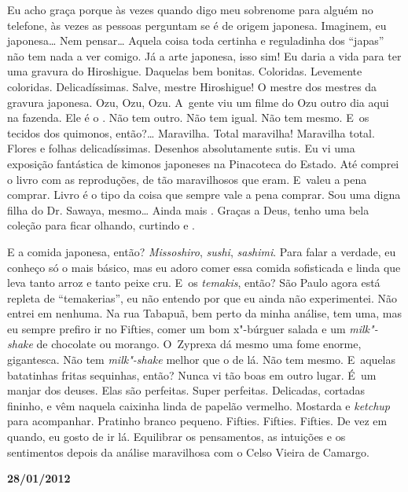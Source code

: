 Eu acho graça porque às vezes quando digo meu sobrenome para alguém no
telefone, às vezes as pessoas perguntam se é de origem japonesa.
Imaginem, eu japonesa… Nem pensar… Aquela coisa toda
certinha e reguladinha dos ``japas'' não tem nada a ver comigo. Já a
arte japonesa, isso sim! Eu daria a vida para ter uma gravura do
Hiroshigue. Daquelas bem bonitas. Coloridas. Levemente coloridas.
Delicadíssimas. Salve, mestre Hiroshigue! O mestre dos mestres da
gravura japonesa. Ozu, Ozu, Ozu. A~gente viu um filme do Ozu outro dia
aqui na fazenda. Ele é o   . Não tem outro. Não tem
igual. Não tem mesmo. E~os tecidos dos quimonos, então?…
Maravilha. Total maravilha! Maravilha total. Flores e folhas
delicadíssimas. Desenhos absolutamente sutis. Eu vi uma exposição
fantástica de kimonos japoneses na Pinacoteca do Estado. Até comprei o
livro com as reproduções, de tão maravilhosos que eram. E~valeu a pena
comprar. Livro é o tipo da coisa que sempre vale a pena comprar. Sou uma
digna filha do Dr. Sawaya, mesmo… Ainda mais   .
Graças a Deus, tenho uma bela coleção para ficar olhando, curtindo e
.

E a comida japonesa, então? \emph{Missoshiro}, \emph{sushi},
\emph{sashimi}. Para falar a verdade, eu conheço só o mais básico, mas
eu adoro comer essa comida sofisticada e linda que leva tanto arroz e
tanto peixe cru. E~os \emph{temakis}, então? São Paulo agora está
repleta de ``temakerias'', eu não entendo por que eu ainda não
experimentei. Não entrei em nenhuma. Na rua Tabapuã, bem perto da minha
análise, tem uma, mas eu sempre prefiro ir no Fifties, comer um bom
x"-búrguer salada e um \emph{milk"-shake} de chocolate ou morango. O~Zyprexa dá mesmo uma fome enorme, gigantesca. Não tem \emph{milk"-shake}
melhor que o de lá. Não tem mesmo. E~aquelas batatinhas fritas
sequinhas, então? Nunca vi tão boas em outro lugar. É~um manjar dos
deuses. Elas são perfeitas. Super perfeitas. Delicadas, cortadas
fininho, e vêm naquela caixinha linda de papelão vermelho. Mostarda e
\emph{ketchup} para acompanhar. Pratinho branco pequeno. Fifties.
Fifties. Fifties. De vez em quando, eu gosto de ir lá. Equilibrar os
pensamentos, as intuições e os sentimentos depois da análise maravilhosa
com o Celso Vieira de Camargo.

\begin{center}\asterisc{}\end{center}


\begin{flushright}\textbf{28/01/2012}\end{flushright}


